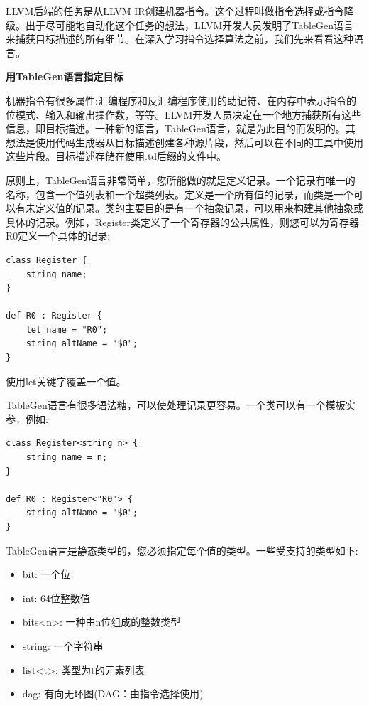
LLVM后端的任务是从LLVM IR创建机器指令。这个过程叫做指令选择或指令降级。出于尽可能地自动化这个任务的想法，LLVM开发人员发明了TableGen语言来捕获目标描述的所有细节。在深入学习指令选择算法之前，我们先来看看这种语言。\par

\hspace*{\fill} \par %
\textbf{用TableGen语言指定目标}

机器指令有很多属性:汇编程序和反汇编程序使用的助记符、在内存中表示指令的位模式、输入和输出操作数，等等。LLVM开发人员决定在一个地方捕获所有这些信息，即目标描述。一种新的语言，TableGen语言，就是为此目的而发明的。其想法是使用代码生成器从目标描述创建各种源片段，然后可以在不同的工具中使用这些片段。目标描述存储在使用.td后缀的文件中。\par

原则上，TableGen语言非常简单，您所能做的就是定义记录。一个记录有唯一的名称，包含一个值列表和一个超类列表。定义是一个所有值的记录，而类是一个可以有未定义值的记录。类的主要目的是有一个抽象记录，可以用来构建其他抽象或具体的记录。例如，Register类定义了一个寄存器的公共属性，则您可以为寄存器R0定义一个具体的记录:\par

\begin{lstlisting}[caption={}]
class Register {
	string name;
}

def R0 : Register {
	let name = "R0";
	string altName = "$0";
}
\end{lstlisting}

使用let关键字覆盖一个值。\par

TableGen语言有很多语法糖，可以使处理记录更容易。一个类可以有一个模板实参，例如:\par

\begin{lstlisting}[caption={}]
class Register<string n> {
	string name = n;
}

def R0 : Register<"R0"> {
	string altName = "$0";
}
\end{lstlisting}

TableGen语言是静态类型的，您必须指定每个值的类型。一些受支持的类型如下:\par

\begin{itemize}
\item bit: 一个位
\item int: 64位整数值
\item bits<n>: 一种由n位组成的整数类型
\item string: 一个字符串
\item list<t>: 类型为t的元素列表
\item dag: 有向无环图(DAG：由指令选择使用)
\end{itemize}

